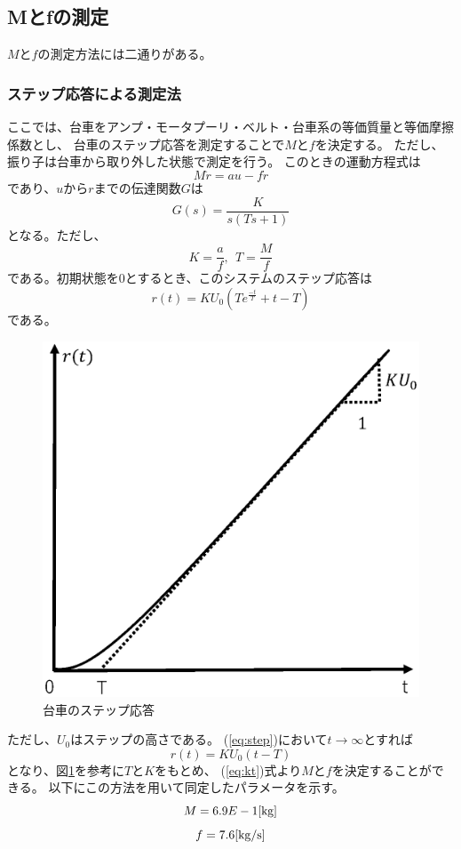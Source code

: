 \subsection{Mとfの測定}
	
	$M$と$f$の測定方法には二通りがある。
	\subsubsection{ステップ応答による測定法}
		ここでは、台車をアンプ・モータプーリ・ベルト・台車系の等価質量と等価摩擦係数とし、
		台車のステップ応答を測定することで$M$と$f$を決定する。
		ただし、振り子は台車から取り外した状態で測定を行う。
		このときの運動方程式は
		\[
			M\ddot{r} = au - f\dot{r}
		\]
		であり、$u$から$r$までの伝達関数$G$は
		\[
			G(s) = \frac{K}{s(Ts+1)}
		\]
		となる。ただし、
		\begin{equation}
			K = \frac{a}{f},\ \ T=\frac{M}{f}
			\label{eq:kt}
		\end{equation}
		である。初期状態を0とするとき、このシステムのステップ応答は
		\begin{equation}
			r(t) = KU_{0}\left(Te^{\frac{-t}{T}}+t-T\right)
			\label{eq:step}
		\end{equation}
		である。
		\begin{figure}[H]
			\centering
			\includegraphics[width=0.6\linewidth]{gazo/step.eps}
			\caption{台車のステップ応答}
			\label{image:parameterMF}
		\end{figure}
		ただし、$U_{0}$はステップの高さである。
		(\ref{eq:step})において$t→\infty$とすれば
		\[
			r(t) = KU_{0}(t-T)
		\]
		となり、図\ref{image:parameterMF}を参考に$T$と$K$をもとめ、
		(\ref{eq:kt})式より$M$と$f$を決定することができる。
		以下にこの方法を用いて同定したパラメータを示す。
		\[
			M=6.9E-1[\rm{kg}]
		\]
		\[
			f=7.6[\rm{kg/s}]
		\]
		
